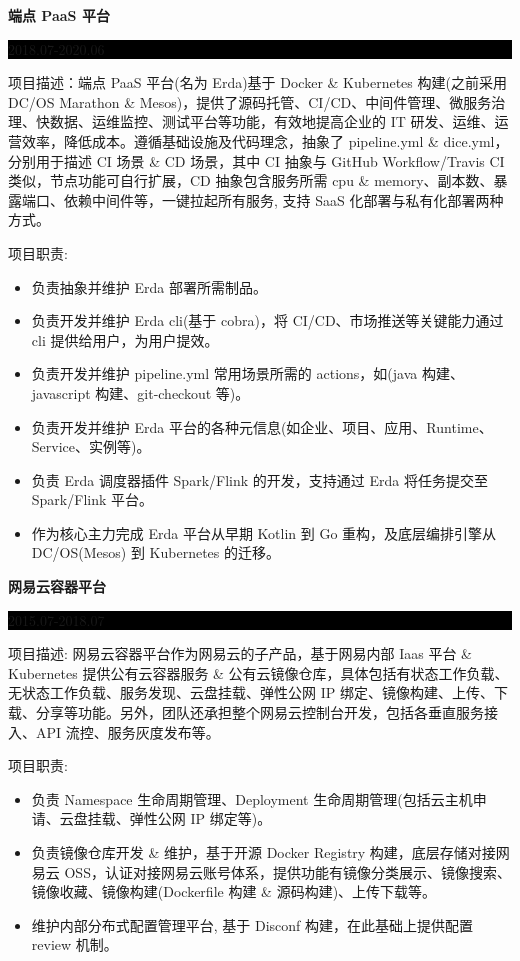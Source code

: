 \documentclass[paper=a4,fontsize=11pt]{scrartcl} %
\newcommand{\sepspace}{\vspace*{1em}}		%
\newcommand{\SubSection}[2]{
	\sepspace \noindent \textbf{#1} \hfill      %
	\colorbox{Black}{\parbox{7em}{\hfill\color{White}#2}} \par  %
	\normalsize \par \sepspace}
\begin{document}
\begin{CJK}{UTF8}{gbsn}
\SubSection{端点 PaaS 平台}{2018.07-2020.06}
项目描述：端点 PaaS 平台(名为 Erda)基于 Docker \& Kubernetes 构建(之前采用 DC/OS Marathon \& Mesos)，提供了源码托管、CI/CD、中间件管理、微服务治理、快数据、运维监控、测试平台等功能，有效地提高企业的 IT 研发、运维、运营效率，降低成本。遵循基础设施及代码理念，抽象了 pipeline.yml \& dice.yml，分别用于描述 CI 场景 \& CD 场景，其中 CI 抽象与 GitHub Workflow/Travis CI 类似，节点功能可自行扩展，CD 抽象包含服务所需 cpu \& memory、副本数、暴露端口、依赖中间件等，一键拉起所有服务, 支持 SaaS 化部署与私有化部署两种方式。\par
\sepspace
项目职责:  
\begin{itemize}
\item 负责抽象并维护 Erda 部署所需制品。
\item 负责开发并维护 Erda cli(基于 cobra)，将 CI/CD、市场推送等关键能力通过 cli 提供给用户，为用户提效。
\item 负责开发并维护 pipeline.yml 常用场景所需的 actions，如(java 构建、javascript 构建、git-checkout 等)。
\item 负责开发并维护 Erda 平台的各种元信息(如企业、项目、应用、Runtime、Service、实例等)。
\item 负责 Erda 调度器插件 Spark/Flink 的开发，支持通过 Erda 将任务提交至 Spark/Flink 平台。
\item 作为核心主力完成 Erda 平台从早期 Kotlin 到 Go 重构，及底层编排引擎从 DC/OS(Mesos) 到 Kubernetes 的迁移。 
\end{itemize}

\SubSection{网易云容器平台}{2015.07-2018.07}
项目描述: 网易云容器平台作为网易云的子产品，基于网易内部 Iaas 平台 \& Kubernetes 提供公有云容器服务 \& 公有云镜像仓库，具体包括有状态工作负载、无状态工作负载、服务发现、云盘挂载、弹性公网 IP 绑定、镜像构建、上传、下载、分享等功能。另外，团队还承担整个网易云控制台开发，包括各垂直服务接入、API 流控、服务灰度发布等。\par
\sepspace
项目职责:
\begin{itemize}
\item 负责 Namespace 生命周期管理、Deployment 生命周期管理(包括云主机申请、云盘挂载、弹性公网 IP 绑定等)。
\item 负责镜像仓库开发 \& 维护，基于开源 Docker Registry 构建，底层存储对接网易云 OSS，认证对接网易云账号体系，提供功能有镜像分类展示、镜像搜索、镜像收藏、镜像构建(Dockerfile 构建 \& 源码构建)、上传下载等。
\item 维护内部分布式配置管理平台, 基于 Disconf 构建，在此基础上提供配置 review 机制。
\end{itemize}


\end{CJK}
\end{document}
